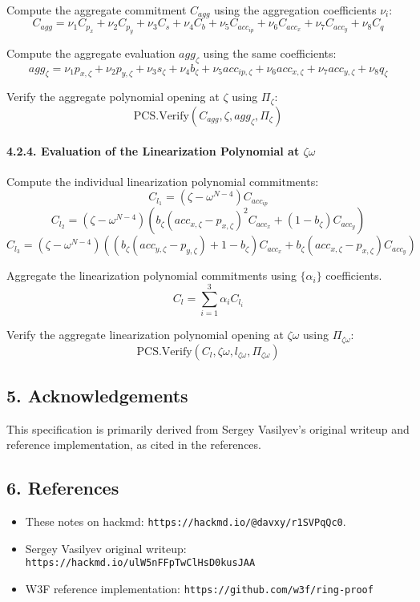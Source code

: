 \documentclass[
]{article}
\providecommand{\tightlist}{%
  \setlength{\itemsep}{0pt}\setlength{\parskip}{0pt}}
\begin{document}
Compute the aggregate commitment \(C_{agg}\) using the aggregation
coefficients \(\nu_i\):
\[C_{agg} = \nu_1 C_{p_x} + \nu_2 C_{p_y} + \nu_3 C_s + \nu_4 C_b + \nu_5 C_{acc_{ip}} + \nu_6 C_{acc_x} + \nu_7 C_{acc_y} + \nu_8 C_q\]

Compute the aggregate evaluation \(agg_\zeta\) using the same
coefficients:
\[agg_\zeta = \nu_1 p_{x,\zeta} + \nu_2 p_{y,\zeta} + \nu_3 s_\zeta + \nu_4 b_\zeta + \nu_5 acc_{ip,\zeta} + \nu_6 acc_{x,\zeta} + \nu_7 acc_{y,\zeta} + \nu_8 q_\zeta\]

Verify the aggregate polynomial opening at \(\zeta\) using
\(\Pi_\zeta\):
\[\text{PCS.Verify}(C_{agg}, \zeta, agg_\zeta, \Pi_\zeta)\]

\hypertarget{evaluation-of-the-linearization-polynomial-at-zeta-omega}{%
\paragraph{\texorpdfstring{4.2.4. Evaluation of the Linearization
Polynomial at
\(\zeta \omega\)}{4.2.4. Evaluation of the Linearization Polynomial at \textbackslash zeta \textbackslash omega}}\label{evaluation-of-the-linearization-polynomial-at-zeta-omega}}

Compute the individual linearization polynomial commitments:
\[C_{l_1}=(\zeta-\omega^{N-4})C_{acc_{ip}}\]
\[C_{l_2}=(\zeta-\omega^{N-4})\left(b_\zeta(acc_{x,\zeta}-p_{x,\zeta})^2C_{acc_x}+(1-b_\zeta)C_{acc_y}\right)\]
\[C_{l_3}=(\zeta-\omega^{N-4})\left(\left(b_\zeta(acc_{y,\zeta}-p_{y,\zeta})+1-b_\zeta\right)C_{acc_x}+b_\zeta(acc_{x,\zeta}-p_{x,\zeta}) C_{acc_y}\right)\]

Aggregate the linearization polynomial commitments using
\(\{\alpha_i\}\) coefficients. \[C_l=\sum_{i=1}^3\alpha_iC_{l_i}\]

Verify the aggregate linearization polynomial opening at
\(\zeta \omega\) using \(\Pi_{\zeta\omega}\):
\[\text{PCS.Verify}(C_{l},\zeta\omega,l_{\zeta\omega},\Pi_{\zeta\omega})\]

\hypertarget{acknowledgements}{%
\subsection{5. Acknowledgements}\label{acknowledgements}}

This specification is primarily derived from Sergey Vasilyev's original
writeup and reference implementation, as cited in the references.

\hypertarget{references}{%
\subsection{6. References}\label{references}}

\begin{itemize}
\tightlist
\item
  These notes on hackmd: \texttt{https://hackmd.io/@davxy/r1SVPqQc0}.
\item
  Sergey Vasilyev original writeup:
  \texttt{https://hackmd.io/ulW5nFFpTwClHsD0kusJAA}
\item
  W3F reference implementation:
  \texttt{https://github.com/w3f/ring-proof}
\end{itemize}
\end{document}
